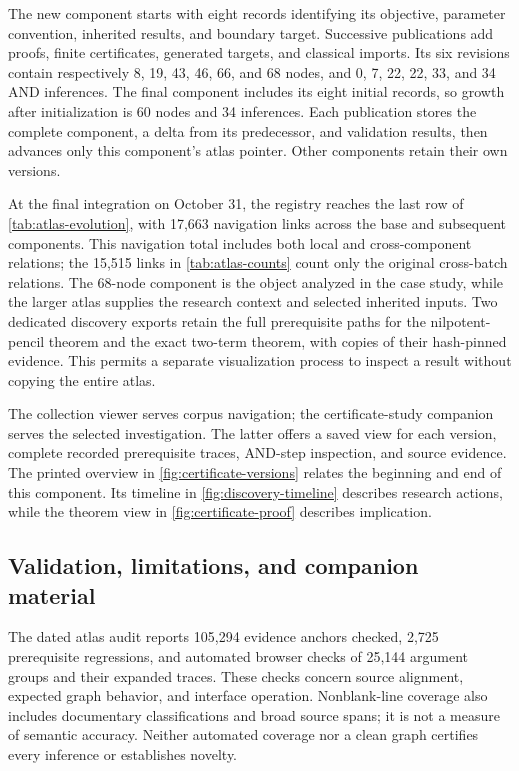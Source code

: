 The new component starts with eight records identifying its objective, parameter convention, inherited results, and boundary target. Successive publications add proofs, finite certificates, generated targets, and classical imports. Its six revisions contain respectively 8, 19, 43, 46, 66, and 68 nodes, and 0, 7, 22, 22, 33, and 34 AND inferences. The final component includes its eight initial records, so growth after initialization is 60 nodes and 34 inferences. Each publication stores the complete component, a delta from its predecessor, and validation results, then advances only this component's atlas pointer. Other components retain their own versions.

At the final integration on October 31, the registry reaches the last row of \cref{tab:atlas-evolution}, with 17,663 navigation links across the base and subsequent components. This navigation total includes both local and cross-component relations; the 15,515 links in \cref{tab:atlas-counts} count only the original cross-batch relations. The 68-node component is the object analyzed in the case study, while the larger atlas supplies the research context and selected inherited inputs. Two dedicated discovery exports retain the full prerequisite paths for the nilpotent-pencil theorem and the exact two-term theorem, with copies of their hash-pinned evidence. This permits a separate visualization process to inspect a result without copying the entire atlas.

The collection viewer serves corpus navigation; the certificate-study companion serves the selected investigation. The latter offers a saved view for each version, complete recorded prerequisite traces, AND-step inspection, and source evidence. The printed overview in \cref{fig:certificate-versions} relates the beginning and end of this component. Its timeline in \cref{fig:discovery-timeline} describes research actions, while the theorem view in \cref{fig:certificate-proof} describes implication.

\subsection{Validation, limitations, and companion material}

The dated atlas audit reports 105,294 evidence anchors checked, 2,725 prerequisite regressions, and automated browser checks of 25,144 argument groups and their expanded traces. These checks concern source alignment, expected graph behavior, and interface operation. Nonblank-line coverage also includes documentary classifications and broad source spans; it is not a measure of semantic accuracy. Neither automated coverage nor a clean graph certifies every inference or establishes novelty.


